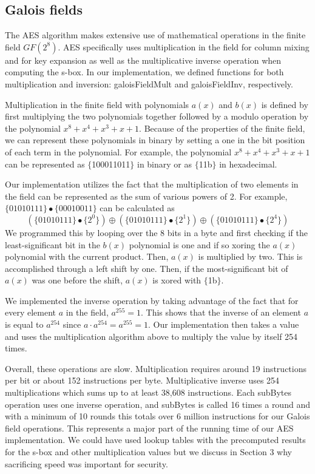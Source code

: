 \documentclass[a4paper,12pt]{article}
\begin{document}
\subsection{Galois fields}
The AES algorithm makes extensive use of mathematical operations in the finite field $GF(2^8)$. AES specifically uses multiplication in the field for column mixing and for key expansion as well as the multiplicative inverse operation when computing the s-box. In our implementation, we defined functions for both multiplication and inversion: {\selectfont galoisFieldMult} and {\selectfont galoisFieldInv}, respectively. 

Multiplication in the finite field with polynomials $a(x)$ and $b(x)$ is defined by first multiplying the two polynomials together followed by a modulo operation by the polynomial $x^8 + x^4 + x^3 + x + 1$. Because of the properties of the finite field, we can represent these polynomials in binary by setting a one in the bit position of each term in the polynomial. For example, the polynomial $x^8 + x^4 + x^3 + x + 1$ can be represented as $\{$100011011$\}$ in binary or as $\{$11b$\}$ in hexadecimal.

Our implementation utilizes the fact that the multiplication of two elements in the field can be represented as the sum of various powers of 2. For example, $\{01010111\} \bullet \{00010011\}$ can be calculated as $$( \{01010111\} \bullet \{2^0\} ) \oplus ( \{01010111\} \bullet \{2^1\} ) \oplus ( \{01010111\} \bullet \{2^{4}\} )$$
We programmed this by looping over the 8 bits in a byte and first checking if the least-significant bit in the $b(x)$ polynomial is one and if so xoring the $a(x)$ polynomial with the current product. Then, $a(x)$ is multiplied by two. This is accomplished through a left shift by one. Then, if the most-significant bit of $a(x)$ was one before the shift, $a(x)$ is xored with $\{$1b$\}$.

We implemented the inverse operation by taking advantage of the fact that for every element $a$ in the field, $a^{255} = 1$. This shows that the inverse of an element $a$ is equal to $a^{254}$ since $a \cdot a^{254} = a^{255} = 1$. Our implementation then takes a value and uses the multiplication algorithm above to multiply the value by itself 254 times.

Overall, these operations are slow. Multiplication requires around 19 instructions per bit or about 152 instructions per byte. Multiplicative inverse uses 254 multiplications which sums up to at least 38,608 instructions. Each {\selectfont subBytes} operation uses one inverse operation, and {\selectfont subBytes} is called 16 times a round and with a minimum of 10 rounds this totals over 6 million instructions for our Galois field operations. This represents a major part of the running time of our AES implementation. We could have used lookup tables with the precomputed results for the s-box and other multiplication values but we discuss in Section 3 why sacrificing speed was important for security. 
\end{document}
